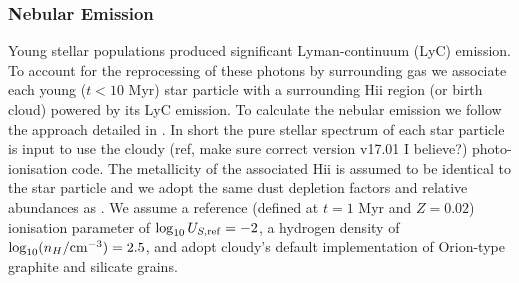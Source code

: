 \subsubsection{Nebular Emission}

Young stellar populations produced significant Lyman-continuum (LyC) emission. To account for the reprocessing of these photons by surrounding gas we associate each young ($t<10$ Myr) star particle with a surrounding H{\sc ii} region (or birth cloud) powered by its LyC emission. To calculate the nebular emission we follow the approach detailed in \cite{Wilkins2020}. In short the pure stellar spectrum of each star particle is input to use the {\sc cloudy} (ref, make sure correct version v17.01 I believe?) photo-ionisation code. The metallicity of the associated H{\sc ii} is assumed to be identical to the star particle and we adopt the same dust depletion factors and relative abundances as \cite{Gutkin2016}. We assume a reference (defined at $t=1$ Myr and $Z=0.02$) ionisation parameter of $\log_{10}U_{S,{\rm ref}}=-2$, a hydrogen density of $\log_{10}(n_{H}/{\rm cm^{-3}})=2.5$, and adopt {\sc cloudy}'s default implementation of Orion-type graphite and silicate grains.




